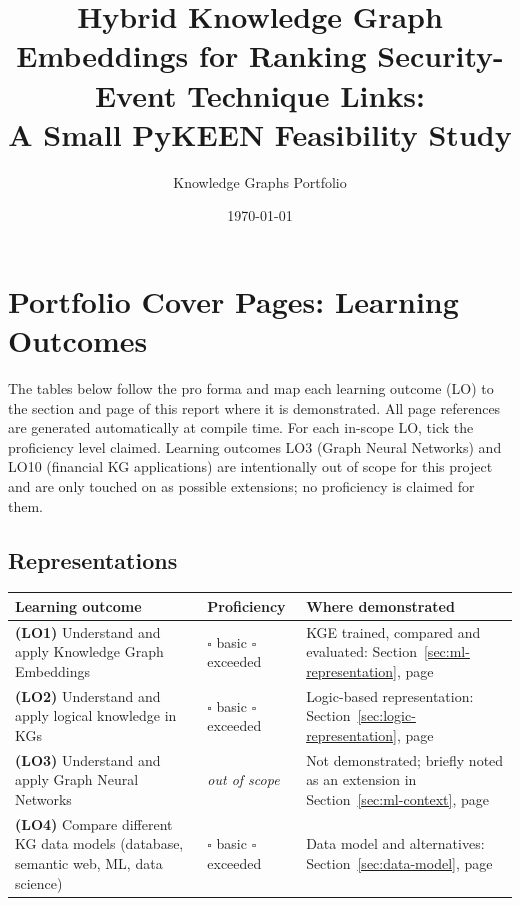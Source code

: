 \documentclass{article}
\title{Hybrid Knowledge Graph Embeddings for Ranking Security-Event Technique Links:\\ A Small PyKEEN Feasibility Study}
\author{Knowledge Graphs Portfolio}
\date{\today}
\newcommand{\lopage}[1]{Section~\ref{#1}, page~\pageref{#1}}
\begin{document}
\maketitle

\section*{Portfolio Cover Pages: Learning Outcomes}
The tables below follow the pro forma and map each learning outcome (LO) to
the section and page of this report where it is demonstrated. All page
references are generated automatically at compile time. For each in-scope LO,
tick the proficiency level claimed. Learning outcomes LO3 (Graph Neural
Networks) and LO10 (financial KG applications) are intentionally out of scope
for this project and are only touched on as possible extensions; no
proficiency is claimed for them.

\subsection*{Representations}
\begin{table}[h]
\centering
\begin{tabular}{p{5.2cm}p{2.6cm}p{5.4cm}}
\toprule
\textbf{Learning outcome} & \textbf{Proficiency} & \textbf{Where demonstrated} \\
\midrule
\textbf{(LO1)} Understand and apply Knowledge Graph Embeddings &
$\square$ basic \newline $\square$ exceeded &
KGE trained, compared and evaluated: \lopage{sec:ml-representation} \\
\addlinespace
\textbf{(LO2)} Understand and apply logical knowledge in KGs &
$\square$ basic \newline $\square$ exceeded &
Logic-based representation: \lopage{sec:logic-representation} \\
\addlinespace
\textbf{(LO3)} Understand and apply Graph Neural Networks &
\textit{out of scope} &
Not demonstrated; briefly noted as an extension in \lopage{sec:ml-context} \\
\addlinespace
\textbf{(LO4)} Compare different KG data models (database, semantic web, ML, data science) &
$\square$ basic \newline $\square$ exceeded &
Data model and alternatives: \lopage{sec:data-model} \\
\bottomrule
\end{tabular}
\end{table}
\end{document}
